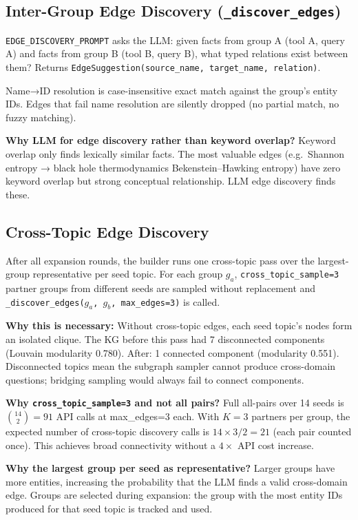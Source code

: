 \documentclass[11pt,a4paper]{article}
\begin{document}
\subsection{Inter-Group Edge Discovery (\texttt{\_discover\_edges})}

\texttt{EDGE\_DISCOVERY\_PROMPT} asks the LLM: given facts from group A (tool A, query A) and facts from group B (tool B, query B), what typed relations exist between them? Returns \texttt{EdgeSuggestion(source\_name, target\_name, relation)}.

Name→ID resolution is case-insensitive exact match against the group's entity IDs. Edges that fail name resolution are silently dropped (no partial match, no fuzzy matching).

\textbf{Why LLM for edge discovery rather than keyword overlap?} Keyword overlap only finds lexically similar facts. The most valuable edges (e.g.\ Shannon entropy → black hole thermodynamics Bekenstein--Hawking entropy) have zero keyword overlap but strong conceptual relationship. LLM edge discovery finds these.

\subsection{Cross-Topic Edge Discovery}
\label{sec:crosstopic}

After all expansion rounds, the builder runs one cross-topic pass over the largest-group representative per seed topic. For each group $g_a$, \texttt{cross\_topic\_sample=3} partner groups from different seeds are sampled without replacement and \texttt{\_discover\_edges($g_a$, $g_b$, max\_edges=3)} is called.

\textbf{Why this is necessary:} Without cross-topic edges, each seed topic's nodes form an isolated clique. The KG before this pass had 7 disconnected components (Louvain modularity 0.780). After: 1 connected component (modularity 0.551). Disconnected topics mean the subgraph sampler cannot produce cross-domain questions; bridging sampling would always fail to connect components.

\textbf{Why \texttt{cross\_topic\_sample=3} and not all pairs?} Full all-pairs over 14 seeds is $\binom{14}{2}=91$ API calls at max\_edges=3 each. With $K=3$ partners per group, the expected number of cross-topic discovery calls is $14 \times 3 / 2 = 21$ (each pair counted once). This achieves broad connectivity without a $4\times$ API cost increase.

\textbf{Why the largest group per seed as representative?} Larger groups have more entities, increasing the probability that the LLM finds a valid cross-domain edge. Groups are selected during expansion: the group with the most entity IDs produced for that seed topic is tracked and used.
\end{document}
